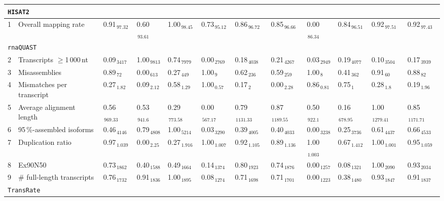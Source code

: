 \documentclass{scrartcl}
\begin{document}
\begin{landscape}
\begin{table}
\begin{scriptsize}
\begin{tabular}{llllllllllll}
\multicolumn{11}{l}{\texttt{HISAT2}}\\ 
\midrule
1 & Overall mapping rate  & 0.91$_{\,97.32}$ & 0.60$_{\,93.61}$ & 1.00$_{\,98.45}$ & 0.73$_{\,95.12}$ & 0.86$_{\,96.72}$ & 0.85$_{\,96.66}$ & 0.00$_{\,86.34}$ & 0.84$_{\,96.51}$ & 0.92$_{\,97.51}$ & 0.92$_{\,97.43}$ \\\midrule
\multicolumn{11}{l}{\texttt{rnaQUAST}}\\ 
\midrule
2 & Transcripts $\geq$1\,000\,nt  & 0.09$_{\,3417}$ & 1.00$_{\,9813}$ & 0.74$_{\,7979}$ & 0.00$_{\,2769}$ & 0.18$_{\,4038}$ & 0.21$_{\,4267}$ & 0.03$_{\,2949}$ & 0.19$_{\,4077}$ & 0.10$_{\,3504}$ & 0.17$_{\,3939}$ \\3 & Misassemblies  & 0.89$_{\,72}$ & 0.00$_{\,613}$ & 0.27$_{\,449}$ & 1.00$_{\,9}$ & 0.62$_{\,236}$ & 0.59$_{\,259}$ & 1.00$_{\,8}$ & 0.41$_{\,362}$ & 0.91$_{\,60}$ & 0.88$_{\,82}$ \\4 & Mismatches per transcript  & 0.27$_{\,1.82}$ & 0.09$_{\,2.12}$ & 0.58$_{\,1.29}$ & 1.00$_{\,0.57}$ & 0.17$_{\,2}$ & 0.00$_{\,2.28}$ & 0.86$_{\,0.81}$ & 0.75$_{\,1}$ & 0.28$_{\,1.8}$ & 0.19$_{\,1.96}$ \\5 & Average alignment length  & 0.56$_{\,969.33}$ & 0.53$_{\,941.6}$ & 0.29$_{\,773.58}$ & 0.00$_{\,567.17}$ & 0.79$_{\,1131.33}$ & 0.87$_{\,1189.55}$ & 0.50$_{\,922.1}$ & 0.16$_{\,678.95}$ & 1.00$_{\,1279.41}$ & 0.85$_{\,1171.71}$ \\6 & 95\,\%-assembled isoforms  & 0.46$_{\,4146}$ & 0.79$_{\,4808}$ & 1.00$_{\,5214}$ & 0.03$_{\,3290}$ & 0.39$_{\,4005}$ & 0.40$_{\,4033}$ & 0.00$_{\,3238}$ & 0.25$_{\,3736}$ & 0.61$_{\,4437}$ & 0.66$_{\,4533}$ \\7 & Duplication ratio  & 0.97$_{\,1.039}$ & 0.00$_{\,2.25}$ & 0.27$_{\,1.916}$ & 1.00$_{\,1.007}$ & 0.92$_{\,1.105}$ & 0.89$_{\,1.136}$ & 1.00$_{\,1.003}$ & 0.67$_{\,1.412}$ & 1.00$_{\,1.001}$ & 0.95$_{\,1.059}$ \\\midrule
8 & Ex90N50  & 0.73$_{\,1862}$ & 0.40$_{\,1588}$ & 0.49$_{\,1664}$ & 0.14$_{\,1374}$ & 0.80$_{\,1923}$ & 0.74$_{\,1876}$ & 0.00$_{\,1257}$ & 0.08$_{\,1321}$ & 1.00$_{\,2090}$ & 0.93$_{\,2034}$ \\9 & \# full-length transcripts  & 0.76$_{\,1732}$ & 0.91$_{\,1836}$ & 1.00$_{\,1895}$ & 0.08$_{\,1274}$ & 0.71$_{\,1698}$ & 0.71$_{\,1701}$ & 0.00$_{\,1223}$ & 0.38$_{\,1480}$ & 0.93$_{\,1847}$ & 0.91$_{\,1837}$ \\\midrule
\multicolumn{11}{l}{\texttt{TransRate}}\\ 
\midrule

\end{tabular}
\end{scriptsize}
\end{table}
\end{landscape}
\end{document}
